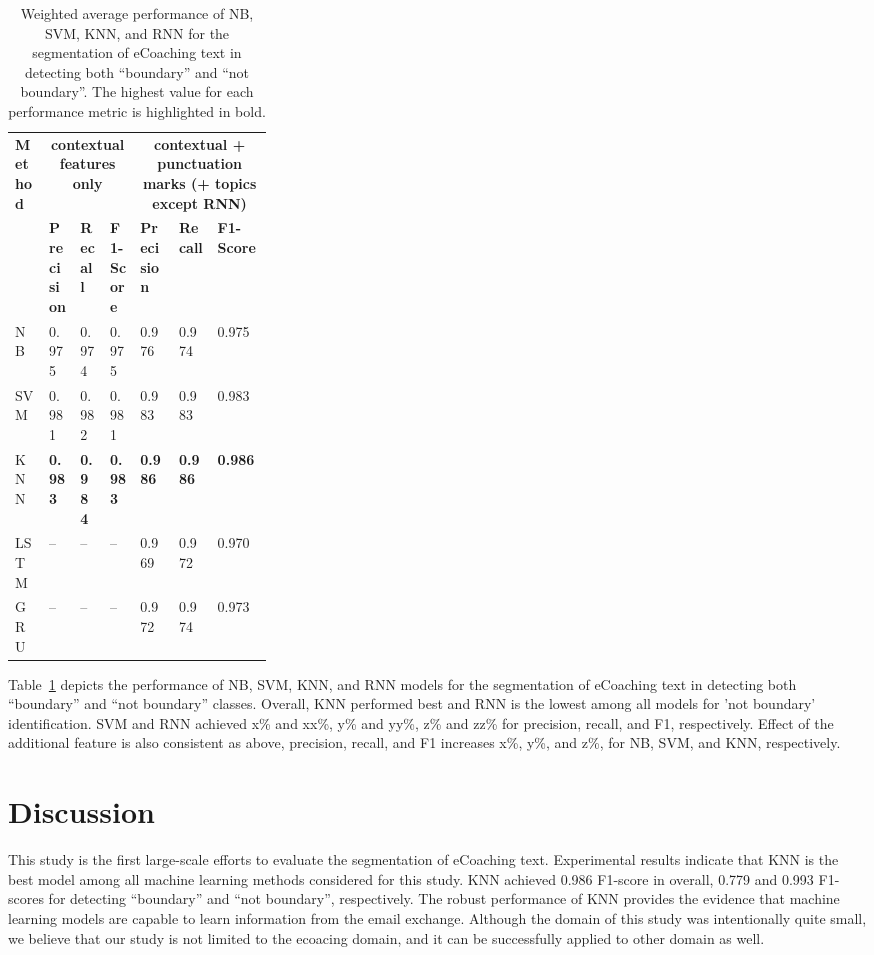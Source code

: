 \documentclass{amia}
\begin{document}
\begin{table}[ht]
\centering
\caption{Weighted average performance of NB, SVM, KNN, and RNN for the segmentation of eCoaching text in detecting both ``boundary'' and ``not boundary''. The highest value for each performance metric is highlighted in bold.}
\label{tab:result_weighted_avg}
  \begin{tabular}{|l|l|l|l|p{0.15\linewidth}|p{0.15\linewidth}|l|}
  \hline
   \multirow{2}{*}{\textbf{Method}} & \multicolumn{3}{|c|}{\textbf{contextual features only}} & \multicolumn{3}{|c|}{\textbf{contextual + punctuation marks (+ topics except RNN)}} \\\cline{2-7}
   & \textbf{Precision}  & \textbf{Recall} & \textbf{F1-Score} & \textbf{Precision}  & \textbf{Recall} & \textbf{F1-Score}\\ \hline    
    
 NB & 0.975 & 0.974 & 0.975 & 0.976 & 0.974 & 0.975 \\ \hline
 SVM & 0.981 & 0.982 & 0.981 & 0.983 & 0.983 & 0.983\\ \hline
 KNN & \textbf{0.983} & \textbf{0.984} & \textbf{0.983} & \textbf{0.986} & \textbf{0.986} & \textbf{0.986}\\ \hline
 LSTM & -- & -- & -- & 0.969 & 0.972 & 0.970 \\ \hline
 GRU & -- & -- & -- & 0.972 & 0.974 & 0.973 \\ \hline 
  \end{tabular}
\end{table} 

Table~\ref{tab:result_weighted_avg} depicts the performance of NB, SVM, KNN, and RNN models for the segmentation of eCoaching text in detecting both ``boundary'' and ``not boundary'' classes. Overall, KNN performed best and RNN is the lowest among all models for 'not boundary' identification. SVM and RNN achieved x\% and xx\%, y\% and yy\%, z\% and zz\% for precision, recall, and F1, respectively. Effect of the additional feature is also consistent as above, precision, recall, and F1 increases x\%, y\%, and z\%, for NB, SVM, and KNN, respectively.\\

\section*{Discussion}
This study is the first large-scale efforts to evaluate the segmentation of eCoaching text. Experimental results indicate that KNN is the best model among all machine learning methods considered for this study. KNN achieved 0.986 F1-score in overall, 0.779 and 0.993 F1-scores for detecting ``boundary'' and ``not boundary'', respectively. The robust performance of KNN provides the evidence that machine learning models are capable to learn information from the email exchange. Although the domain of this study was intentionally quite small, we believe that our study is not limited to the ecoacing domain, and it can be successfully applied to other domain as well.
\end{document}
